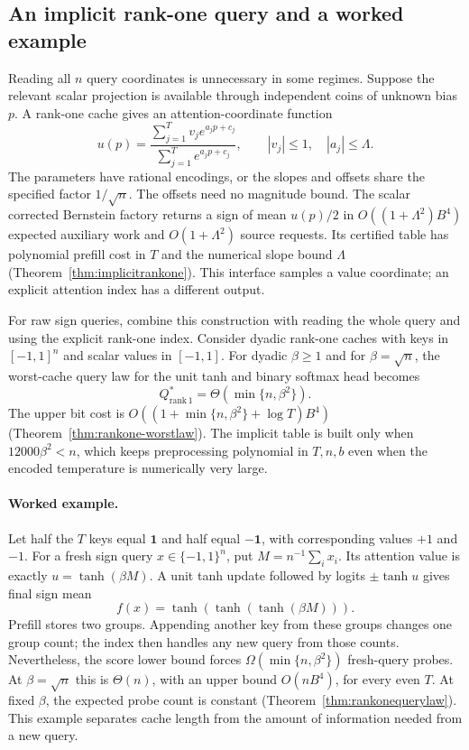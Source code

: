 \subsection{An implicit rank-one query and a worked example}

Reading all $n$ query coordinates is unnecessary in some regimes.
Suppose the relevant scalar projection is available through
independent coins of unknown bias $p$. A rank-one cache gives
an attention-coordinate function
\begin{equation}
 u(p)=\frac{\sum_{j=1}^T v_j e^{a_jp+c_j}}
            {\sum_{j=1}^T e^{a_jp+c_j}},
 \qquad |v_j|\le1,\quad |a_j|\le\Lambda .
 \label{eq:main-scalar-attention}
\end{equation}
The parameters have rational encodings, or the slopes and offsets
share the specified factor $1/\sqrt n$. The offsets need no magnitude bound.
The scalar corrected Bernstein factory returns a sign of mean
$u(p)/2$ in $O((1+\Lambda^2)B^4)$ expected auxiliary work and
$O(1+\Lambda^2)$ source requests. Its certified table has
polynomial prefill cost in $T$ and the numerical slope bound
$\Lambda$ (Theorem~\ref{thm:implicitrankone}). This interface
samples a value coordinate; an explicit attention index has a
different output.

For raw sign queries, combine this construction with reading the
whole query and using the explicit rank-one index. Consider dyadic
rank-one caches with keys in $[-1,1]^n$ and scalar values in $[-1,1]$.
For dyadic $\beta\ge1$ and for $\beta=\sqrt n$, the worst-cache
query law for the unit tanh and binary softmax head becomes
\begin{equation}
 Q^*_{\mathrm{rank}\,1}
   =\Theta(\min\{n,\beta^2\}).
 \label{eq:main-rankone-law}
\end{equation}
The upper bit cost is
$O((1+\min\{n,\beta^2\}+\log T)B^4)$
(Theorem~\ref{thm:rankone-worstlaw}). The implicit table
is built only when $12000\beta^2<n$, which keeps preprocessing
polynomial in $T,n,b$ even when the encoded temperature is
numerically very large.

\paragraph{Worked example.}
Let half the $T$ keys equal $\mathbf1$ and half equal
$-\mathbf1$, with corresponding values $+1$ and $-1$.
For a fresh sign query $x\in\{-1,1\}^n$, put
$M=n^{-1}\sum_i x_i$. Its attention value is exactly
$u=\tanh(\beta M)$. A unit tanh update followed by logits
$\pm\tanh u$ gives final sign mean
\[
 f(x)=\tanh(\tanh(\tanh(\beta M))).
\]
Prefill stores two groups. Appending another key from these
groups changes one group count;
the index then handles any new query from those counts. Nevertheless, the score lower bound forces
$\Omega(\min\{n,\beta^2\})$ fresh-query probes.
At $\beta=\sqrt n$ this is $\Theta(n)$, with an upper bound
$O(nB^4)$, for every even $T$. At fixed $\beta$, the expected
probe count is constant (Theorem~\ref{thm:rankonequerylaw}). This
example separates cache length from the amount of information needed
from a new query.

